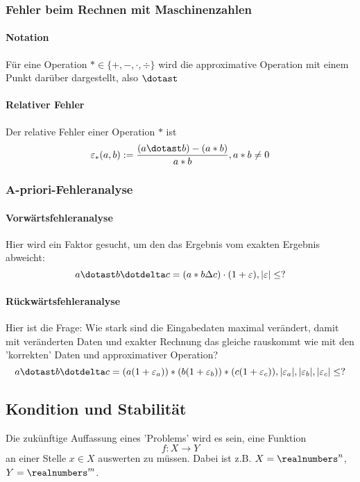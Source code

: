 					
			\subsubsection{Fehler beim Rechnen mit Maschinenzahlen}
				\paragraph{Notation}Für eine Operation $ \ast  \in \{+,-,\cdot,\div\}$ wird die approximative Operation mit einem Punkt darüber dargestellt, also $ \dotast $
				
				\paragraph{Relativer Fehler}Der relative Fehler einer Operation $ \ast $ ist
				$$ \varepsilon_\ast(a,b) := \frac{(a \dotast b) - (a \ast b)}{a \ast b}, a \ast b \neq 0 $$ \pagebreak
				
		
			\subsubsection{A-priori-Fehleranalyse}
				\paragraph{Vorwärtsfehleranalyse} Hier wird ein Faktor gesucht, um den das Ergebnis vom exakten Ergebnis abweicht:
				$$ a \dotast b \dotdelta c = (a \ast b \Delta c) \cdot (1+\varepsilon), |\varepsilon| \leq ?$$
				
				\paragraph{Rückwärtsfehleranalyse} Hier ist die Frage: Wie stark sind die Eingabedaten maximal verändert, damit mit veränderten Daten und exakter Rechnung das gleiche rauskommt wie mit den 'korrekten' Daten und approximativer Operation?
				$$ a \dotast b \dotdelta c = (a(1+\varepsilon_a)) \ast (b(1+\varepsilon_b)) \ast (c(1+\varepsilon_c)), |\varepsilon_a|,|\varepsilon_b|, |\varepsilon_c| \leq ? $$\Biglb
				
				
		\subsection{Kondition und Stabilität}
			Die zukünftige Auffassung eines 'Problems' wird es sein, eine Funktion
				$$ f: X \longrightarrow Y $$
			an einer Stelle $ x \in X $ auswerten zu müssen. Dabei ist z.B. $ X = \realnumbers^n $, $ Y = \realnumbers^m $.
			
